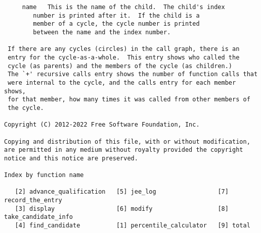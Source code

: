 \documentclass{article}
\begin{document}
\begin{verbatim}
     name	This is the name of the child.  The child's index
		number is printed after it.  If the child is a
		member of a cycle, the cycle number is printed
		between the name and the index number.

 If there are any cycles (circles) in the call graph, there is an
 entry for the cycle-as-a-whole.  This entry shows who called the
 cycle (as parents) and the members of the cycle (as children.)
 The `+' recursive calls entry shows the number of function calls that
 were internal to the cycle, and the calls entry for each member shows,
 for that member, how many times it was called from other members of
 the cycle.

Copyright (C) 2012-2022 Free Software Foundation, Inc.

Copying and distribution of this file, with or without modification,
are permitted in any medium without royalty provided the copyright
notice and this notice are preserved.

Index by function name

   [2] advance_qualification   [5] jee_log                 [7] record_the_entry
   [3] display                 [6] modify                  [8] take_candidate_info
   [4] find_candidate          [1] percentile_calculator   [9] total
\end{verbatim}

\pagebreak
\end{document}
